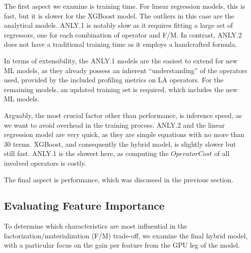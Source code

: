 The first aspect we examine is training time. For linear regression models, this is fast, but it is slower for the XGBoost model. The outliers in this case are the analytical models. ANLY.1 is notably slow as it requires fitting a large set of regressors, one for each combination of operator and F/M. In contrast, ANLY.2 does not have a traditional training time as it employs a handcrafted formula.

In terms of extensibility, the ANLY.1 models are the easiest to extend for new ML models, as they already possess an inherent ``understanding'' of the operators used, provided by the included profiling metrics on LA operators. For the remaining models, an updated training set is required, which includes the new ML models.

Arguably, the most crucial factor other than performance, is inference speed, as we want to avoid overhead in the training process. ANLY.2 and the linear regression model are very quick, as they are simple equations with no more than $30$ terms. XGBoost, and consequently the hybrid model, is slightly slower but still fast. ANLY.1 is the slowest here, as computing the $OperatorCost$ of all involved operators is costly.

The final aspect is performance, which was discussed in the previous section.

\subsection{Evaluating Feature Importance}
\label{subsec:6-feature-importance}
To determine which characteristics are most influential in the factorization/materialization (F/M) trade-off, we examine the final hybrid model, with a particular focus on the gain per feature from the GPU leg of the model.

